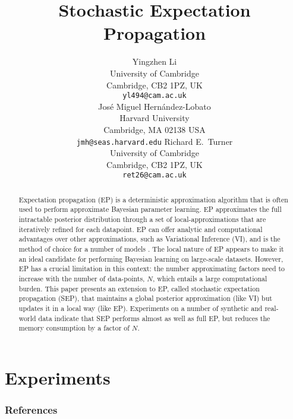 \documentclass{article} %
\title{Stochastic Expectation Propagation}
\author{
Yingzhen Li \\
University of Cambridge\\
Cambridge, CB2 1PZ, UK \\
\texttt{yl494@cam.ac.uk} \\
\And
Jos\'e Miguel Hern\'andez-Lobato\\
Harvard University \\
Cambridge, MA 02138 USA \\
\texttt{jmh@seas.harvard.edu}
\And
Richard E.~Turner \\
University of Cambridge\\
Cambridge, CB2 1PZ, UK \\
\texttt{ret26@cam.ac.uk} \\
}
\begin{document}
\maketitle

\begin{abstract}
Expectation propagation (EP) is a deterministic approximation algorithm that is often used to perform approximate Bayesian parameter learning. EP approximates the full intractable posterior distribution through a set of local-approximations that are iteratively refined for each datapoint. EP can offer analytic and computational advantages over other approximations, such as Variational Inference (VI), and is the method of choice for a number of models \cite{can we have citations}. The local nature of EP appears to make it an ideal candidate for performing Bayesian learning on large-scale datasets. However, EP has a crucial limitation in this context: the number approximating factors need to increase with the number of data-points, $N$, which entails a large computational burden. This paper presents an extension to EP, called stochastic expectation propagation (SEP), that maintains a global posterior approximation (like VI) but updates it in a local way (like EP).  Experiments on a number of synthetic and real-world data indicate that SEP performs almost as well as full EP, but reduces the memory consumption by a factor of $N$. 
\end{abstract}







%

%

\section{Experiments}






\subsubsection*{References}
\renewcommand{\section}[2]{}


\end{document}
